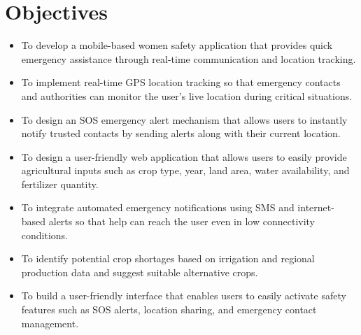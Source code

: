 \documentclass[a4paper,12pt]{report}
\begin{document}
\section{Objectives}

\begin{itemize}
    \item To develop a mobile-based women safety application that provides quick emergency assistance through real-time communication and location tracking.
\end{itemize}

\begin{itemize}
    \item To implement real-time GPS location tracking so that emergency contacts and authorities can monitor the user’s live location during critical situations.
\end{itemize}

\begin{itemize}
    \item To design an SOS emergency alert mechanism that allows users to instantly notify trusted contacts by sending alerts along with their current location.
\end{itemize}

\begin{itemize}
    \item To design a user-friendly web application that allows users to easily provide agricultural inputs such as crop type, year, land area, water availability, and fertilizer quantity.
\end{itemize}

\begin{itemize}
    \item To integrate automated emergency notifications using SMS and internet-based alerts so that help can reach the user even in low connectivity conditions.
\end{itemize}

\begin{itemize}
    \item To identify potential crop shortages based on irrigation and regional production data and suggest suitable alternative crops.
\end{itemize}

\begin{itemize}
    \item To build a user-friendly interface that enables users to easily activate safety features such as SOS alerts, location sharing, and emergency contact management.
\end{itemize}
\end{document}
